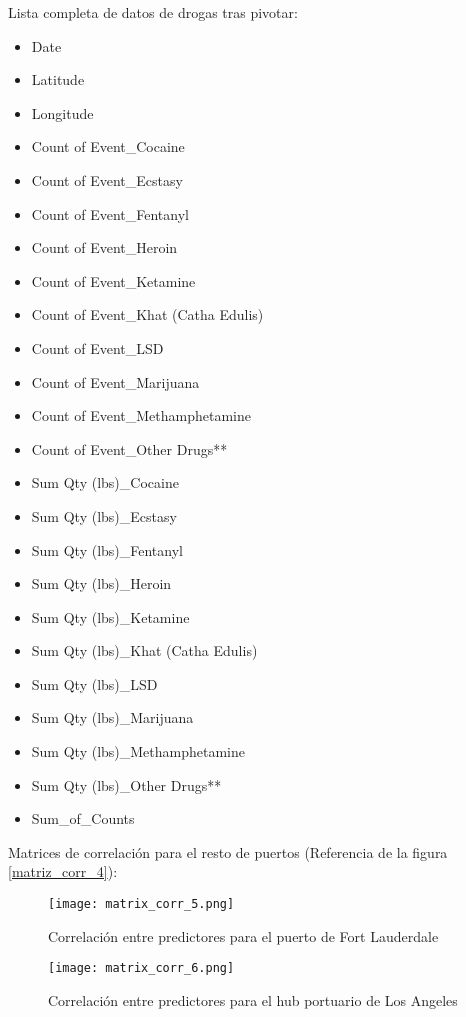 \documentclass[12pt]{article}
\begin{document}
\newpage

Lista completa de datos de drogas tras pivotar:
\begin{itemize}
	\item Date
	\item Latitude
	\item Longitude
	\item Count of Event\_Cocaine
	\item Count of Event\_Ecstasy
	\item Count of Event\_Fentanyl
	\item Count of Event\_Heroin
	\item Count of Event\_Ketamine
	\item Count of Event\_Khat (Catha Edulis)
	\item Count of Event\_LSD
	\item Count of Event\_Marijuana
	\item Count of Event\_Methamphetamine
	\item Count of Event\_Other Drugs**
	\item Sum Qty (lbs)\_Cocaine
	\item Sum Qty (lbs)\_Ecstasy
	\item Sum Qty (lbs)\_Fentanyl
	\item Sum Qty (lbs)\_Heroin
	\item Sum Qty (lbs)\_Ketamine
	\item Sum Qty (lbs)\_Khat (Catha Edulis)
	\item Sum Qty (lbs)\_LSD
	\item Sum Qty (lbs)\_Marijuana
	\item Sum Qty (lbs)\_Methamphetamine
	\item Sum Qty (lbs)\_Other Drugs**
	\item Sum\_of\_Counts
\end{itemize}

\newpage
Matrices de correlación para el resto de puertos (Referencia de la figura \ref{matriz_corr_4}):

\begin{figure}[H]
	\caption{\label{matriz_corr_5} Correlación entre predictores para el puerto de Fort Lauderdale}
	\centering
	\hspace*{1cm}
	\texttt{[image: matrix\_corr\_5.png]}
\end{figure}

\begin{figure}[H]
	\caption{\label{matriz_corr_6} Correlación entre predictores para el hub portuario de Los Angeles}
	\centering
	\hspace*{1cm}
	\texttt{[image: matrix\_corr\_6.png]}
\end{figure}
\end{document}
